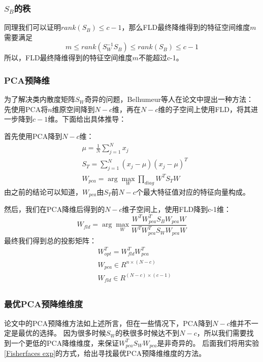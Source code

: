 \documentclass{ctexart}
\begin{document}
\subsubsection{$S_B$的秩}
同理我们可以证明$rank(S_B) \leq c-1$，那么FLD最终降维得到的特征空间维度$m$需要满足
$$
    m \leq rank(S_W^{-1}S_B)\leq rank(S_B)\leq c-1
$$
所以，FLD最终降维得到的特征空间维度$m$不能超过c-1。


\subsubsection{PCA预降维}
为了解决类内散度矩阵$S_W$奇异的问题，Belhumeur等人在论文\cite{Belhumeur1997Eigenfaces}中提出一种方法：
先使用PCA将$n$维原空间降到$N-c$维，再在$N-c$维的子空间上使用FLD，将其进一步降到$c-1$维。下面给出具体推导：

\noindent
首先使用PCA降到$N-c$维：
\begin{equation}\nonumber
    \begin{split}
        &\mu =\frac{1}{N}\sum_{j=1}^Nx_j\\
        &S_T=\sum_{j=1}^N (x_j-\mu)(x_j-\mu)^T\\
        &W_{pca} = \arg \max_W \prod_{diag}W^TS_T W
    \end{split}
\end{equation}
由之前的结论可以知道，$W_{pca}$由$S_T$前$N-c$个最大特征值对应的特征向量构成。

\noindent
然后，我们在PCA降维后得到的$N-c$维子空间上，使用FLD降到c-1维：
$$
    W_{fld}= \arg \max_W\frac{W^T W_{pca}^T S_B W_{pca} W}
    {W^T W_{pca}^T S_W W_{pca} W}
$$
\noindent
最终我们得到总的投影矩阵：
\begin{equation}\nonumber
    \begin{split}
        &W_{opt}^T=W_{fld}^T W_{pca}^T\\
        &W_{pca} \in R^{n\times(N-c)}\\
        &W_{fld} \in R^{(N-c)\times (c-1)}\\
    \end{split}
\end{equation}

\subsubsection{最优PCA预降维维度}
论文\cite{Belhumeur1997Eigenfaces}中的PCA预降维方法如上述所言，但在一些情况下，PCA降到$N-c$维并不一定是最优的选择。
因为很多时候$S_W$的秩很多时候达不到$N-c$，所以我们需要找到一个更低的PCA降维维度，来保证$W_{pca}^T S_W W_{pca}$是非奇异的。
后面我们将用实验\ref{Fisherfaces exp}的方式，给出寻找最优PCA预降维维度的方法。
\end{document}
